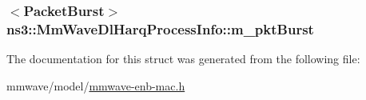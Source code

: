 \subsubsection[{\texorpdfstring{m\+\_\+pkt\+Burst}{m_pktBurst}}]{$<${\bf Packet\+Burst}$>$ ns3\+::\+Mm\+Wave\+Dl\+Harq\+Process\+Info\+::m\+\_\+pkt\+Burst}\hypertarget{structns3_1_1MmWaveDlHarqProcessInfo_ad07c640ba798a8f9354fb678211624ab}{}\label{structns3_1_1MmWaveDlHarqProcessInfo_ad07c640ba798a8f9354fb678211624ab}


The documentation for this struct was generated from the following file\+:\begin{DoxyCompactItemize}
\item 
mmwave/model/\hyperlink{mmwave-enb-mac_8h}{mmwave-\/enb-\/mac.\+h}\end{DoxyCompactItemize}
